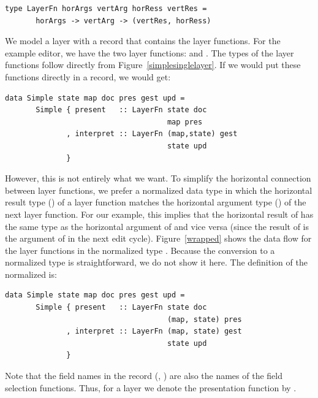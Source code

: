\documentclass[preprint,natbib]{sigplanconf}
\begin{document}
\begin{small}
\begin{verbatim}
type LayerFn horArgs vertArg horRess vertRes =
       horArgs -> vertArg -> (vertRes, horRess)
\end{verbatim}
\end{small}

We model a layer with a record that contains the layer functions. For the example editor, we have the two layer functions:  and . The types of the layer functions follow directly from Figure~\ref{simplesinglelayer}.  If we would put these functions directly in a record, we would get:

\begin{small}
\begin{verbatim}
data Simple state map doc pres gest upd =
       Simple { present   :: LayerFn state doc 
                                     map pres
              , interpret :: LayerFn (map,state) gest
                                     state upd
              }
\end{verbatim}
\end{small}


However, this is not entirely what we want. To simplify the horizontal connection between layer functions, we prefer a normalized data type in which the horizontal result type () of a layer function matches the horizontal argument type () of the next layer function. For our example, this implies that the horizontal result of  has the same type as the horizontal argument of  and vice versa (since the result of  is the argument of  in the next edit cycle). Figure~\ref{wrapped} shows the data flow for the layer functions in the normalized type . Because the conversion to a normalized type is straightforward, we do not show it here. The definition of the normalized  is:

\begin{small}
\begin{verbatim}
data Simple state map doc pres gest upd =
       Simple { present   :: LayerFn state doc 
                                     (map, state) pres
              , interpret :: LayerFn (map, state) gest
                                     state upd
              }
\end{verbatim}
\end{small}


Note that the field names in the record (, ) are also the names of the field selection functions. Thus, for a layer  we denote the presentation function by . 
\end{document}
